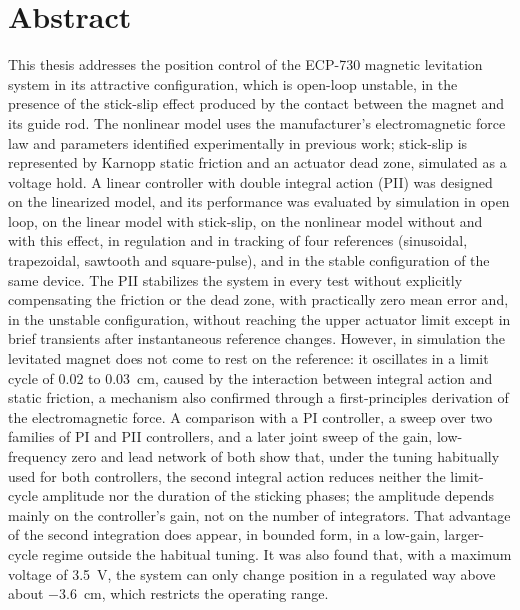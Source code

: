 \chapter*{Abstract}\label{Chap:Abstract}

This thesis addresses the position control of the ECP-730 magnetic levitation system in its attractive configuration, which is open-loop unstable, in the presence of the stick-slip effect produced by the contact between the magnet and its guide rod. The nonlinear model uses the manufacturer's electromagnetic force law and parameters identified experimentally in previous work; stick-slip is represented by Karnopp static friction and an actuator dead zone, simulated as a voltage hold. A linear controller with double integral action (PII) was designed on the linearized model, and its performance was evaluated by simulation in open loop, on the linear model with stick-slip, on the nonlinear model without and with this effect, in regulation and in tracking of four references (sinusoidal, trapezoidal, sawtooth and square-pulse), and in the stable configuration of the same device. The PII stabilizes the system in every test without explicitly compensating the friction or the dead zone, with practically zero mean error and, in the unstable configuration, without reaching the upper actuator limit except in brief transients after instantaneous reference changes. However, in simulation the levitated magnet does not come to rest on the reference: it oscillates in a limit cycle of 0.02 to 0.03~cm, caused by the interaction between integral action and static friction, a mechanism also confirmed through a first-principles derivation of the electromagnetic force. A comparison with a PI controller, a sweep over two families of PI and PII controllers, and a later joint sweep of the gain, low-frequency zero and lead network of both show that, under the tuning habitually used for both controllers, the second integral action reduces neither the limit-cycle amplitude nor the duration of the sticking phases; the amplitude depends mainly on the controller's gain, not on the number of integrators. That advantage of the second integration does appear, in bounded form, in a low-gain, larger-cycle regime outside the habitual tuning. It was also found that, with a maximum voltage of 3.5~V, the system can only change position in a regulated way above about $-3.6$~cm, which restricts the operating range.
